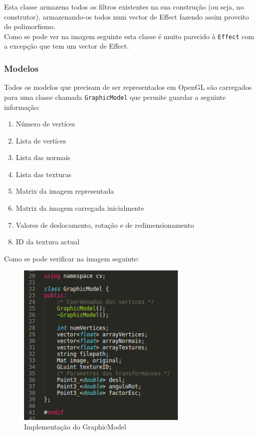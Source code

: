 \documentclass[portugues,final]{revdetua}
\begin{document}
Esta classe armazena todos os filtros existentes na sua construção (ou seja, no construtor), armazenando-os todos num vector de Effect fazendo assim proveito do polimorfismo.\\

\break
Como se pode ver na imagem seguinte esta classe é muito parecido à {\tt Effect} com a excepção que tem um vector de Effect.


\subsubsection{Modelos}

Todos os modelos que precisam de ser representados em OpenGL são carregados para uma classe chamada {\tt GraphicModel} que permite guardar a seguinte informação:
\begin{enumerate}
\item{Número de vertíces}
\item{Lista de vertíces}
\item{Lista das normais}
\item{Lista das texturas}
\item{Matrix da imagem representada}
\item{Matrix da imagem carregada inicialmente}
\item{Valores de deslocamento, rotação e de redimensionamento}
\item{ID da textura actual}
\end{enumerate}

Como se pode verificar na imagem seguinte:

\begin{figure}[H]
\centerline{\includegraphics[width=230pt]{images/graphicmodel.png}}
\caption{Implementação do GraphicModel}
\label{img:complete}
\end{figure}
\end{document}
